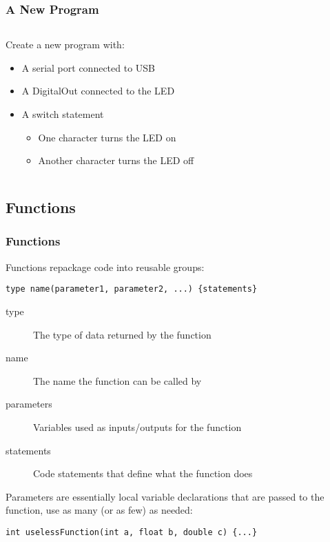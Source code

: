 \begin{frame}[fragile]
	\frametitle{A New Program}
	\begin{columns}[T]
		\begin{column}{0.5\textwidth}
			Create a new program with:
			\begin{itemize}
				\item A serial port connected to USB
				\item A DigitalOut connected to the LED
				\item A switch statement
				\begin{itemize}
					\item One character turns the LED on
					\item Another character turns the LED off
				\end{itemize}
			\end{itemize}
		\end{column}
		\begin{column}{0.5\textwidth}
			\pause
			
		\end{column}
	\end{columns}
\end{frame}

\subsection{Functions}
\label{sub:functions}
\begin{frame}[fragile]
	\frametitle{Functions}
	Functions repackage code into reusable groups:
	\begin{lstlisting}[numbers=none]
		type name(parameter1, parameter2, ...) {statements}
	\end{lstlisting}
	\begin{description}
		\item[type] The type of data returned by the function
		\item[name] The name the function can be called by
		\item[parameters] Variables used as inputs/outputs for the function
		\item[statements] Code statements that define what the function does
	\end{description}
	\vfill
	Parameters are essentially local variable declarations that are passed to the function, use as many (or as few) as needed:
	\begin{lstlisting}[numbers=none]
		int uselessFunction(int a, float b, double c) {...}
	\end{lstlisting}
\end{frame}

